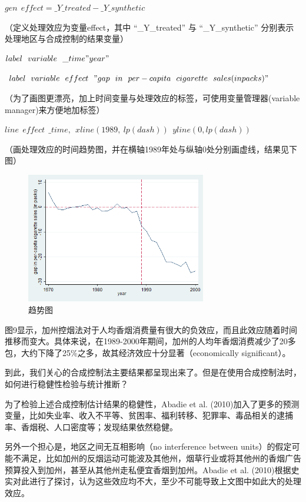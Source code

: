 \documentclass[cn,12pt,math=newtx,citestyle=gb7714-2015,bibstyle=gb7714-2015]{elegantbook}
\begin{document}
	\textbf{$gen~~effect= \_Y\_treated - \_Y\_synthetic$}
	
	（定义处理效应为变量effect，其中 “\_Y\_treated” 与 “\_Y\_synthetic” 分别表示处理地区与合成控制的结果变量）
	
	\textbf{$label~~variable~~\_time "year"$}
	
	\textbf{$label~~variable~~effect~~"gap~~in~~per-capita~~cigarette~~sales (in packs)"$}
	
	（为了画图更漂亮，加上时间变量与处理效应的标签，可使用变量管理器(variable manager)来方便地加标签）
	
	\textbf{$line~~effect~~\_time,~~xline(1989,~lp(dash))~~yline(0,lp(dash))$}
	
	（画处理效应的时间趋势图，并在横轴1989年处与纵轴0处分别画虚线，结果见下图）
	\begin{figure}[htbp]
		\centering
		\includegraphics[width=0.7\textwidth]{line2.png}
		\caption{趋势图}\label{fig:digit}
	\end{figure}
	
	图9显示，加州控烟法对于人均香烟消费量有很大的负效应，而且此效应随着时间推移而变大。具体来说，在1989-2000年期间，加州的人均年香烟消费减少了20多包，大约下降了25\%之多，故其经济效应十分显著（economically significant）。
	
	到此，我们关心的合成控制法主要结果都呈现出来了。但是在使用合成控制法时，如何进行稳健性检验与统计推断？
	
	为了检验上述合成控制估计结果的稳健性，Abadie et al. (2010)加入了更多的预测变量，比如失业率、收入不平等、贫困率、福利转移、犯罪率、毒品相关的逮捕率、香烟税、人口密度等；发现结果依然稳健。
	
	另外一个担心是，地区之间无互相影响（no interference between units）的假定可能不满足，比如加州的反烟运动可能波及其他州，烟草行业或将其他州的香烟广告预算投入到加州，甚至从其他州走私便宜香烟到加州。Abadie et al. (2010)根据史实对此进行了探讨，认为这些效应均不大，至少不可能导致上文图中如此大的处理效应。
	
\end{document}
